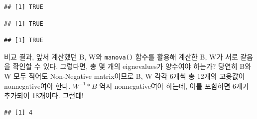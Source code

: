 \documentclass[
]{article}
\newenvironment{Shaded}{\begin{snugshade}}{\end{snugshade}}
\newcommand{\DecValTok}[1]{\textcolor[rgb]{0.00,0.00,0.81}{#1}}
\newcommand{\FunctionTok}[1]{\textcolor[rgb]{0.13,0.29,0.53}{\textbf{#1}}}
\newcommand{\NormalTok}[1]{#1}
\newcommand{\SpecialCharTok}[1]{\textcolor[rgb]{0.81,0.36,0.00}{\textbf{#1}}}
\begin{document}
\begin{verbatim}
## [1] TRUE
\end{verbatim}

\begin{Shaded}
\end{Shaded}

\begin{verbatim}
## [1] TRUE
\end{verbatim}

\begin{Shaded}
\end{Shaded}

\begin{verbatim}
## [1] TRUE
\end{verbatim}

비교 결과, 앞서 계산했던 B, W와 \texttt{manova()} 함수를 활용해 계산한
B, W가 서로 같음을 확인할 수 있다. 그렇다면, 총 몇 개의 eignevalues가
양수여야 하는가? 당연히 B와 W 모두 적어도 Non-Negative matrix이므로 B, W
각각 6개씩 총 12개의 고윳값이 nonnegative여야 한다. \(W^{-1}*B\) 역시
nonnegative여야 하는데, 이를 포함하면 6개가 추가되어 18개이다. 그런데!

\begin{Shaded}
\end{Shaded}

\begin{verbatim}
## [1] 4
\end{verbatim}

\begin{Shaded}
\end{Shaded}
\end{document}
